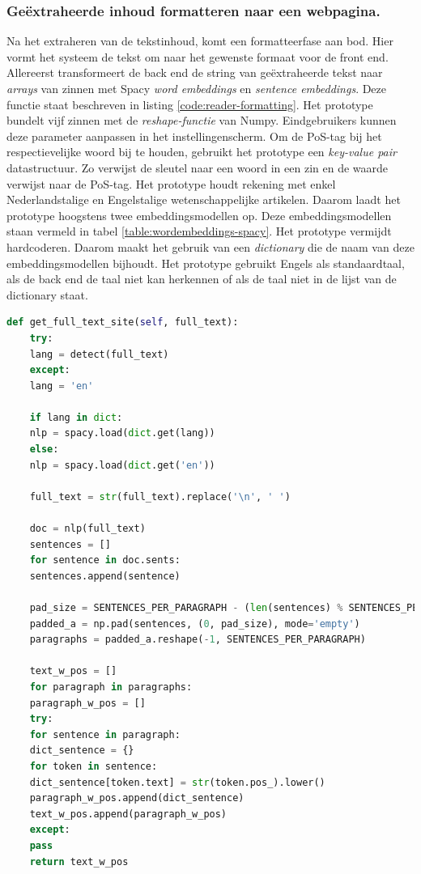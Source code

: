\subsubsection{Geëxtraheerde inhoud formatteren naar een webpagina.}

Na het extraheren van de tekstinhoud, komt een formatteerfase aan bod. Hier vormt het systeem de tekst om naar het gewenste formaat voor de front end. Allereerst transformeert de back end de string van geëxtraheerde tekst naar \textit{arrays} van zinnen met Spacy \textit{word embeddings} en \textit{sentence embeddings}. Deze functie staat beschreven in listing \ref{code:reader-formatting}. Het prototype bundelt vijf zinnen met de \textit{reshape-functie} van Numpy. Eindgebruikers kunnen deze parameter aanpassen in het instellingenscherm. Om de PoS-tag bij het respectievelijke woord bij te houden, gebruikt het prototype een \textit{key-value pair} datastructuur. Zo verwijst de sleutel naar een woord in een zin en de waarde verwijst naar de PoS-tag. Het prototype houdt rekening met enkel Nederlandstalige en Engelstalige wetenschappelijke artikelen. Daarom laadt het prototype hoogstens twee embeddingsmodellen op. Deze embeddingsmodellen staan vermeld in tabel \ref{table:wordembeddings-spacy}. Het prototype vermijdt hardcoderen. Daarom maakt het gebruik van een \textit{dictionary} die de naam van deze embeddingsmodellen bijhoudt. Het prototype gebruikt Engels als standaardtaal, als de back end de taal niet kan herkennen of als de taal niet in de lijst van de dictionary staat. 

\begin{lstlisting}[language=Python, caption={Het formatteren van de tekst naar een formaat voor de website.}, label={code:reader-formatting}]
	def get_full_text_site(self, full_text):
	try:
	lang = detect(full_text)
	except:
	lang = 'en'
	
	if lang in dict:
	nlp = spacy.load(dict.get(lang))
	else:
	nlp = spacy.load(dict.get('en'))
	
	full_text = str(full_text).replace('\n', ' ')
	
	doc = nlp(full_text)
	sentences = []
	for sentence in doc.sents:
	sentences.append(sentence)
	
	pad_size = SENTENCES_PER_PARAGRAPH - (len(sentences) % SENTENCES_PER_PARAGRAPH)
	padded_a = np.pad(sentences, (0, pad_size), mode='empty')
	paragraphs = padded_a.reshape(-1, SENTENCES_PER_PARAGRAPH)
	
	text_w_pos = []
	for paragraph in paragraphs:
	paragraph_w_pos = []
	try:
	for sentence in paragraph:
	dict_sentence = {}
	for token in sentence:
	dict_sentence[token.text] = str(token.pos_).lower()
	paragraph_w_pos.append(dict_sentence)    
	text_w_pos.append(paragraph_w_pos)
	except:
	pass
	return text_w_pos
\end{lstlisting}

